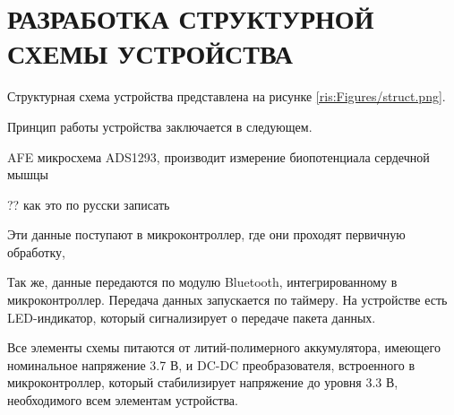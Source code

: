 \begin{sloppypar} %
\newpage %
\section{РАЗРАБОТКА СТРУКТУРНОЙ СХЕМЫ УСТРОЙСТВА} %
Структурная схема устройства представлена на рисунке \ref{ris:Figures/struct.png}.

Принцип работы устройства заключается в следующем. 

AFE микросхема ADS1293, производит измерение биопотенциала сердечной мышцы

\begin{Huge} 
?? как это по русски записать
\end{Huge} 


Эти данные поступают в микроконтроллер, где они проходят первичную обработку, 

Так же, данные передаются по модулю Bluetooth, интегрированному в микроконтроллер. Передача данных запускается по таймеру. На устройстве есть LED-индикатор, который сигнализирует о передаче пакета данных. 

Все элементы схемы питаются от литий-полимерного аккумулятора, имеющего номинальное напряжение 3.7 В, и DC-DC преобразователя, встроенного в микроконтроллер, который стабилизирует напряжение до уровня 3.3 В, необходимого всем элементам устройства.

\end{sloppypar}
